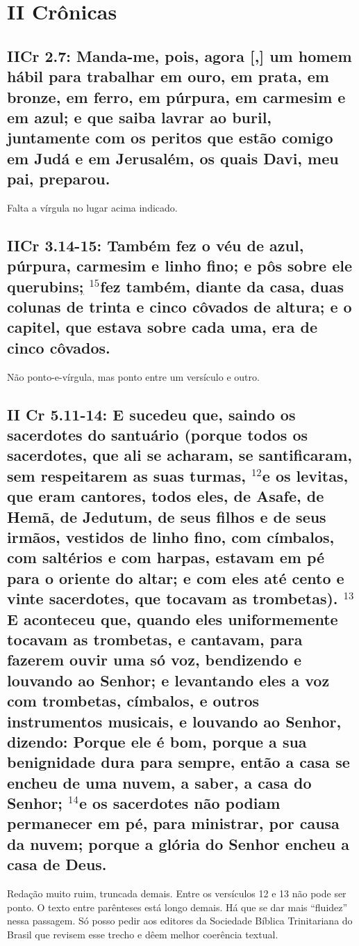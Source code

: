 \section{II Crônicas}
\subsection{IICr 2.7: Manda-me, pois, agora [,] um homem hábil para trabalhar em ouro, em prata, em bronze, em ferro, em púrpura, em carmesim e em azul; e que saiba lavrar ao buril, juntamente com os peritos que estão comigo em Judá e em Jerusalém, os quais Davi, meu pai, preparou.}
Falta a vírgula no lugar acima indicado.

\subsection{IICr 3.14-15: Também fez o véu de azul, púrpura, carmesim e linho fino; e pôs sobre ele querubins\uline{;} $^{\mathrm{15}}$fez também, diante da casa, duas colunas de trinta e cinco côvados de altura; e o capitel, que estava sobre cada uma, era de cinco côvados.}
Não ponto-e-vírgula, mas ponto entre um versículo e outro.

\subsection{II Cr 5.11-14: E sucedeu que, saindo os sacerdotes do santuário (porque todos os sacerdotes, que ali se acharam, se santificaram, sem respeitarem as suas turmas, $^{\mathrm{12}}$e os levitas, que eram cantores, todos eles, de Asafe, de Hemã, de Jedutum, de seus filhos e de seus irmãos, vestidos de linho fino, com címbalos, com saltérios e com harpas, estavam em pé para o oriente do altar; e com eles até cento e vinte sacerdotes, que tocavam as trombetas). $^{\mathrm{13}}$E aconteceu que, quando eles uniformemente tocavam as trombetas, e cantavam, para fazerem ouvir uma só voz, bendizendo e louvando ao Senhor; e levantando eles a voz com trombetas, címbalos, e outros instrumentos musicais, e louvando ao Senhor, dizendo: Porque ele é bom, porque a sua benignidade dura para sempre, então a casa se encheu de uma nuvem, a saber, a casa do Senhor; $^{\mathrm{14}}$e os sacerdotes não podiam permanecer em pé, para ministrar, por causa da nuvem; porque a glória do Senhor encheu a casa de Deus.}

Redação muito ruim, truncada demais. Entre os versículos 12 e 13
não pode ser ponto. O texto entre parênteses está longo demais. Há que
se dar mais ``fluidez'' nessa passagem. Só posso pedir aos editores
da Sociedade Bíblica Trinitariana do Brasil que revisem esse trecho e
dêem melhor coerência textual.


